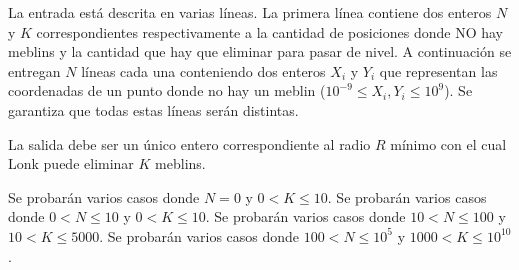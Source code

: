 \documentclass{oci}
\begin{document}
\begin{inputDescription}
  La entrada está descrita en varias líneas.
  La primera línea contiene dos enteros $N$ y $K$ correspondientes
  respectivamente a la cantidad de posiciones donde NO hay meblins y la cantidad
  que hay que eliminar para pasar de nivel.
  A continuación se entregan $N$ líneas cada una conteniendo dos enteros $X_i$ y
  $Y_i$ que representan las coordenadas de un punto donde no hay un meblin
  ($10^{-9}\leq X_i, Y_i\leq 10^9$).
  Se garantiza que todas estas líneas serán distintas.
\end{inputDescription}

\begin{outputDescription}
  La salida debe ser un único entero correspondiente al radio $R$
  mínimo con el cual Lonk puede eliminar $K$ meblins.
\end{outputDescription}

\begin{scoreDescription}
 Se probarán varios casos donde $N=0$ y $0 < K \leq 10$.
 Se probarán varios casos donde $0 < N \leq 10$ y $0 < K \leq 10$.
 Se probarán varios casos donde $10 < N \leq 100$ y $10 < K \leq 5000$.
 Se probarán varios casos donde $100 < N \leq 10^5$ y $1000 < K \leq 10^10$.
\end{scoreDescription}

\begin{sampleDescription}
\end{sampleDescription}
\end{document}
